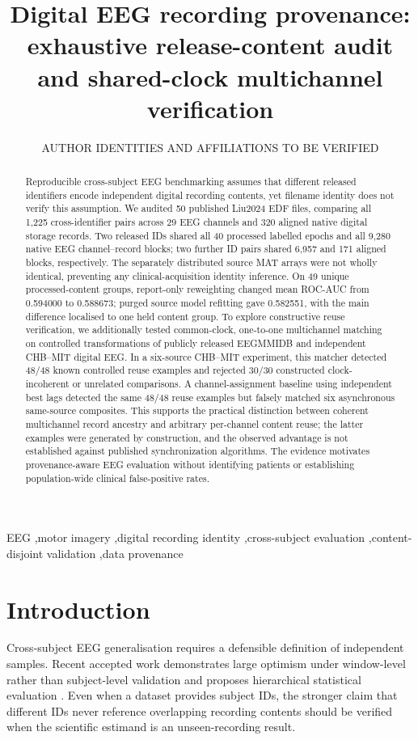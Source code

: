 \documentclass[preprint,12pt]{elsarticle}
\begin{document}
\begin{frontmatter}
\title{Digital EEG recording provenance: exhaustive release-content audit
and shared-clock multichannel verification}
\author{AUTHOR IDENTITIES AND AFFILIATIONS TO BE VERIFIED}
\begin{abstract}
Reproducible cross-subject EEG benchmarking assumes that
different released identifiers encode independent digital
recording contents, yet filename identity does not verify this
assumption. We audited 50 published Liu2024 EDF files,
comparing all 1,225 cross-identifier pairs across 29 EEG
channels and 320 aligned native digital storage records.
Two released IDs shared all 40 processed labelled epochs and
all 9,280 native EEG channel--record blocks; two further ID
pairs shared 6,957 and 171 aligned blocks, respectively.
The separately distributed source MAT arrays were not wholly
identical, preventing any clinical-acquisition identity
inference. On 49 unique processed-content groups, report-only
reweighting changed mean ROC-AUC from 0.594000 to 0.588673;
purged source model refitting gave 0.582551, with the main
difference localised to one held content group. To explore
constructive reuse verification, we additionally tested
common-clock, one-to-one multichannel matching on controlled
transformations of publicly released EEGMMIDB and independent
CHB--MIT digital EEG. In a six-source CHB--MIT experiment, this
matcher detected 48/48 known controlled reuse examples and
rejected 30/30 constructed clock-incoherent or unrelated
comparisons. A channel-assignment baseline using independent
best lags detected the same 48/48 reuse examples but falsely
matched six asynchronous same-source composites. This supports
the practical distinction between coherent multichannel record
ancestry and arbitrary per-channel content reuse; the latter
examples were generated by construction, and the observed
advantage is not established against published synchronization
algorithms. The evidence motivates provenance-aware EEG
evaluation without identifying patients or establishing
population-wide clinical false-positive rates.
\end{abstract}

\begin{keyword}
EEG \sep motor imagery \sep digital recording identity \sep cross-subject
evaluation \sep content-disjoint validation \sep data provenance
\end{keyword}
\end{frontmatter}

\section{Introduction}
Cross-subject EEG generalisation requires a defensible definition of
independent samples. Recent accepted work demonstrates large optimism
under window-level rather than subject-level validation and proposes
hierarchical statistical evaluation \cite{gil2026subjectvalidation}.
Even when a dataset provides subject IDs, the stronger claim that
different IDs never reference overlapping recording contents should be
verified when the scientific estimand is an unseen-recording result.
\end{document}
